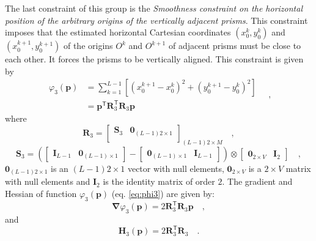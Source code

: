 The last constraint of this group is the \textit{Smoothness constraint on the horizontal position of 
the arbitrary origins of the vertically adjacent prisms}. This constraint imposes that the estimated horizontal 
Cartesian coordinates $(x_{0}^{k}, y_{0}^{k})$ and $(x_{0}^{k+1}, y_{0}^{k+1})$ of the origins $O^{k}$ and $O^{k+1}$ 
of adjacent prisms must be close to each other. It forces the prisms to be vertically aligned. This constraint 
is given by
\begin{equation}\label{eq:phi3}
\begin{split}
\varphi_{3}(\mathbf{p}) &= \sum\limits^{L-1}_{k=1}\left[\left(x_{0}^{k+1} - x_{0}^{k}\right)^2 + \left(y_{0}^{k+1} - y_{0}^{k}\right)^2 \right] \\
&= \mathbf{p}^{\mathsf{T}} \mathbf{R}^{\mathsf{T}}_{3}\mathbf{R}_{3}\mathbf{p}
\end{split} \quad ,
\end{equation}
where 
\begin{equation}
\mathbf{R}_{3} = 
\begin{bmatrix}
\mathbf{S}_{3} & \mathbf{0}_{(L-1)2 \times 1} \\
\end{bmatrix}_{(L-1)2 \times M} \quad ,
\label{eq:R3-matrix}
\end{equation}
\begin{equation}
\mathbf{S}_{3} =
\left( 
\begin{bmatrix} \mathbf{I}_{L-1} & \mathbf{0}_{(L-1) \times 1} \end{bmatrix} -
\begin{bmatrix} \mathbf{0}_{(L-1) \times 1} & \mathbf{I}_{L-1} \end{bmatrix} 
\right) \otimes 
\begin{bmatrix} \mathbf{0}_{2 \times V} & \mathbf{I}_{2} \end{bmatrix} \quad ,
\label{eq:S3-matrix}
\end{equation}
$\mathbf{0}_{(L-1)2 \times 1}$ is an $(L-1)2 \times 1$ vector with null elements,
$\mathbf{0}_{2 \times V}$ is a $2 \times V$ matrix with null elements and 
$\mathbf{I}_{2}$ is the identity matrix of order $2$. The gradient and Hessian of function $\varphi_{3}(\mathbf{p})$ (eq. \ref{eq:phi3}) are given by:
\begin{equation}\label{eq:phi3_grad}
\boldsymbol{\nabla}\varphi_{3}(\mathbf{p}) = 2 \mathbf{R}^{\mathsf{T}}_{3}\mathbf{R}_{3}\mathbf{p} \quad ,
\end{equation}
and
\begin{equation}\label{eq:phi3_hessian}
\mathbf{H}_{3}(\mathbf{p}) = 2 \mathbf{R}^{\mathsf{T}}_{3}\mathbf{R}_{3} \quad .
\end{equation}

